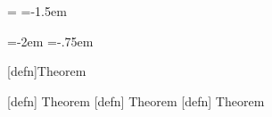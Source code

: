 \usepackage[top=1in,left=1in,right=1in,bindingoffset=5mm,twoside]{geometry}

\usepackage{amssymb}
\usepackage{amsmath}
\usepackage{enumitem}
\usepackage{framed}
\usepackage[framed]{ntheorem}
\usepackage{dsfont}
\usepackage{bm}
\usepackage{quoting}
\usepackage{setspace}
\usepackage{xifthen}
\usepackage{textcomp}
\usepackage{nameref}
\usepackage{tikz}
\usepackage{graphicx}




\newcommand\onestar{$\star$}
\newcommand\twostar{$\star\star$}
\newcommand\threestar{$\star\star\star$}



\theoremstyle{margin}
\theorembodyfont{\normalfont}
\theorempreskipamount=\baselineskip
\theorempostskipamount=-1.5em

\theoremprework{\begin{onehalfspace}} \theorempostwork{\end{onehalfspace}}
\newtheorem{defn}{Definition}  %

\theoremprework{\begin{onehalfspace}} \theorempostwork{\end{onehalfspace}}
\newtheorem{example}[defn]{Example}

\theoremprework{\begin{onehalfspace}} \theorempostwork{\end{onehalfspace}}
\newtheorem{axiom}[defn]{Axiom}

\newtheorem{corol}[defn]{Corollary}

\newtheorem{conjecture}[defn]{Conjecture}


\theoremprework{\begin{onehalfspace}} \theorempostwork{\end{onehalfspace}}
\newtheorem{thmex}[defn]{Example Theorem}

\theoremheaderfont{\scshape}
\theoremindent\parindent
\newtheorem*{proofex}[defn]{Example Proof}
\theoremheaderfont{\normalfont\bfseries}

\theoremstyle{plain}
\theorembodyfont{\normalfont}

\theorempreskipamount=-2em
\theorempostskipamount=-.75em

[defn]{Theorem}

[defn]{\raisebox{.1em}{\onestar} Theorem}
[defn]{\raisebox{.1em}{\twostar} Theorem}
[defn]{\raisebox{.1em}{\threestar} Theorem}


